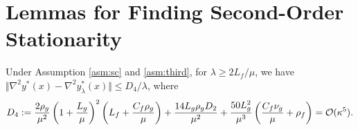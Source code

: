 \section{Lemmas for Finding Second-Order Stationarity} \label{apx:lem-2nd}


\begin{lem} \label{lem:nabla2-yx}
Under Assumption \ref{asm:sc} and \ref{asm:third}, 
for $\lambda \ge  2L_f / \mu$,
we have $ \Vert \nabla^2 y^*(x) -\nabla^2 y_{\lambda}^*(x)  \Vert \le D_4 /\lambda$, where 
\begin{align*}
    D_4 := \frac{2\rho_g}{\mu^2}  \left( 1 + \frac{L_g}{\mu}\right)^2  \left(L_f + 
     \frac{C_f \rho_g}{\mu}
     \right) +   \frac{14 L_g \rho_g D_2}{\mu^2} + \frac{50 L_g^2 }{\mu^3} \left( \frac{C_f \nu_g}{\mu} + \rho_f \right) = {\mathcal{O}}(\kappa^5).
\end{align*}
\end{lem}

